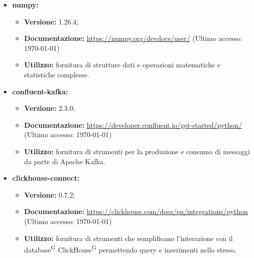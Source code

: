 \documentclass[8pt]{article}
\newcommand{\glossterm}[1]{#1\textsuperscript{G}} %
\begin{document}
\begin{itemize}
\begin{itemize}
\begin{itemize}
            \item \textbf{Documentazione:} \href{https://docs.python.org/3/library/unittest.html}{\color{myblue}https://docs.python.org/3/library/unittest.html} (Ultimo accesso: \today)
            \item \textbf{Utilizzo:} scrittura di script di test d'unità agevolati dall'uso di patch, asserzioni e set up di casistiche di testing.
        \end{itemize}
        \item \textbf{numpy:}
        \begin{itemize}
	\setlength\itemsep{0em}
            \item \textbf{Versione:} 1.26.4;
            \item \textbf{Documentazione:} \href{https://numpy.org/devdocs/user/}{\color{myblue}https://numpy.org/devdocs/user/} (Ultimo accesso: \today)
            \item \textbf{Utilizzo:} fornitura di strutture dati e operazioni matematiche e statistiche complesse.
        \end{itemize}
        \item \textbf{confluent-kafka:}
        \begin{itemize}
	\setlength\itemsep{0em}
            \item \textbf{Versione:} 2.3.0;
            \item \textbf{Documentazione:} \href{https://developer.confluent.io/get-started/python/}{\color{myblue}https://developer.confluent.io/get-started/python/} (Ultimo accesso: \today)
            \item \textbf{Utilizzo:} fornitura di strumenti per la produzione e consumo di messaggi da parte di Apache Kafka.
        \end{itemize}
        \item \textbf{clickhouse-connect:}
        \begin{itemize}
	\setlength\itemsep{0em}
            \item \textbf{Versione:} 0.7.2;
            \item \textbf{Documentazione:} \href{https://clickhouse.com/docs/en/integrations/python}{\color{myblue}https://clickhouse.com/docs/en/integrations/python} (Ultimo accesso: \today)
            \item \textbf{Utilizzo:} fornitura di strumenti che semplificano l'interazione con il \glossterm{database} \glossterm{ClickHouse} permettendo query e inserimenti nello stesso.
        \end{itemize}
    \end{itemize}
\end{itemize}
\end{document}
